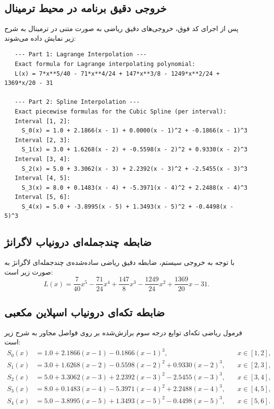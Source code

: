  \subsection{خروجی دقیق برنامه در محیط ترمینال}
 پس از اجرای کد فوق، خروجی‌های دقیق ریاضی به صورت متنی در ترمینال به شرح زیر نمایش داده می‌شوند:
	
 \begin{latin}
  \begin{verbatim}
   --- Part 1: Lagrange Interpolation ---
   Exact formula for Lagrange interpolating polynomial:
   L(x) = 7*x**5/40 - 71*x**4/24 + 147*x**3/8 - 1249*x**2/24 + 1369*x/20 - 31
			
   --- Part 2: Spline Interpolation ---
   Exact piecewise formulas for the Cubic Spline (per interval):
   Interval [1, 2]:
     S_0(x) = 1.0 + 2.1866(x - 1) + 0.0000(x - 1)^2 + -0.1866(x - 1)^3
   Interval [2, 3]:
     S_1(x) = 3.0 + 1.6268(x - 2) + -0.5598(x - 2)^2 + 0.9330(x - 2)^3
   Interval [3, 4]:
     S_2(x) = 5.0 + 3.3062(x - 3) + 2.2392(x - 3)^2 + -2.5455(x - 3)^3
   Interval [4, 5]:
     S_3(x) = 8.0 + 0.1483(x - 4) + -5.3971(x - 4)^2 + 2.2488(x - 4)^3
   Interval [5, 6]:
     S_4(x) = 5.0 + -3.8995(x - 5) + 1.3493(x - 5)^2 + -0.4498(x - 5)^3
  \end{verbatim}
 \end{latin}
	
 \subsection{ضابطه چندجمله‌ای درونیاب لاگرانژ}
 با توجه به خروجی سیستم، ضابطه دقیق ریاضی ساده‌شده‌ی چندجمله‌ای لاگرانژ به صورت زیر است:
 \[
 L(x) = \frac{7}{40}x^5 - \frac{71}{24}x^4 + \frac{147}{8}x^3 - \frac{1249}{24}x^2 + \frac{1369}{20}x - 31.
 \]
	
 \subsection{ضابطه تکه‌ای درونیاب اسپلاین مکعبی}
 فرمول ریاضی تکه‌ای توابع درجه سوم برازش‌شده بر روی فواصل مجاور به شرح زیر است:
 \begin{align*}
  S_0(x) &= 1.0 + 2.1866(x - 1) - 0.1866(x - 1)^3, \quad & x \in [1, 2], \\
  S_1(x) &= 3.0 + 1.6268(x - 2) - 0.5598(x - 2)^2 + 0.9330(x - 2)^3, \quad & x \in [2, 3], \\
  S_2(x) &= 5.0 + 3.3062(x - 3) + 2.2392(x - 3)^2 - 2.5455(x - 3)^3, \quad & x \in [3, 4], \\
  S_3(x) &= 8.0 + 0.1483(x - 4) - 5.3971(x - 4)^2 + 2.2488(x - 4)^3, \quad & x \in [4, 5], \\
  S_4(x) &= 5.0 - 3.8995(x - 5) + 1.3493(x - 5)^2 - 0.4498(x - 5)^3, \quad & x \in [5, 6].
 \end{align*}
	
